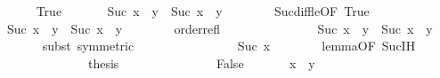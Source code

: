 \begin{isabellebody}
\ \ \ \ \isamarkupfalse%
\ True\isanewline
\ \ \ \ \isamarkupfalse%
\ {}{\isacharcolon}{\kern0pt}\ {\isachardoublequoteopen}{\isacharparenleft}{\kern0pt}Suc\ x{\isacharparenright}{\kern0pt}\ {\isacharminus}{\kern0pt}\ y\ {\isacharequal}{\kern0pt}\ Suc\ {\isacharparenleft}{\kern0pt}x\ {\isacharminus}{\kern0pt}\ y{\isacharparenright}{\kern0pt}{\isachardoublequoteclose}\isanewline
\ \ \ \ \ \ \isamarkupfalse%
\ Suc{\isacharunderscore}{\kern0pt}diff{\isacharunderscore}{\kern0pt}le{\isacharbrackleft}{\kern0pt}OF\ True{\isacharbrackright}{\kern0pt}\isanewline
\ \ \ \ \ \ \isacommand{{\isachardot}{\kern0pt}}\isamarkupfalse%
\isanewline
\ \ \ \ \isamarkupfalse%
\ {\isachardoublequoteopen}Suc\ x\ {\isacharminus}{\kern0pt}\ y\ {\isasymle}\ Suc\ x\ {\isacharminus}{\kern0pt}\ y{\isachardoublequoteclose}\isanewline
\ \ \ \ \ \ \isamarkupfalse%
\ order{\isachardot}{\kern0pt}refl\isanewline
\ \ \ \ \ \ \isacommand{{\isachardot}{\kern0pt}}\isamarkupfalse%
\isanewline
\ \ \ \ \isamarkupfalse%
\ \isamarkupfalse%
\ {}{\isacharcolon}{\kern0pt}\ {\isachardoublequoteopen}Suc\ x\ {\isacharminus}{\kern0pt}\ y\ {\isasymle}\ Suc\ {\isacharparenleft}{\kern0pt}x\ {\isacharminus}{\kern0pt}\ y{\isacharparenright}{\kern0pt}{\isachardoublequoteclose}\isanewline
\ \ \ \ \ \ \isamarkupfalse%
{\isacharparenleft}{\kern0pt}subst\ {}{\isacharbrackleft}{\kern0pt}symmetric{\isacharbrackright}{\kern0pt}{\isacharparenright}{\kern0pt}\isanewline
\ \ \ \ \ \ \isacommand{{\isachardot}{\kern0pt}}\isamarkupfalse%
\isanewline
\ \ \ \ \isamarkupfalse%
\ \isamarkupfalse%
\ {\isachardoublequoteopen}{\isachardot}{\kern0pt}{\isachardot}{\kern0pt}{\isachardot}{\kern0pt}\ {\isasymle}\ Suc\ x{\isachardoublequoteclose}\isanewline
\ \ \ \ \ \ \isamarkupfalse%
\ lemma{}{\isacharbrackleft}{\kern0pt}OF\ Suc{\isachardot}{\kern0pt}IH{\isacharbrackright}{\kern0pt}\isanewline
\ \ \ \ \ \ \isacommand{{\isachardot}{\kern0pt}}\isamarkupfalse%
\isanewline
\ \ \ \ \isamarkupfalse%
\ \isamarkupfalse%
\ {\isacharquery}{\kern0pt}thesis\isanewline
\ \ \ \ \ \ \isacommand{{\isachardot}{\kern0pt}}\isamarkupfalse%
\isanewline
\ \ \isamarkupfalse%
\isanewline
\ \ \ \ \isamarkupfalse%
\ False\isanewline
\ \ \ \ \isamarkupfalse%
\ {}{\isacharcolon}{\kern0pt}\ {\isachardoublequoteopen}x\ {\isacharless}{\kern0pt}\ y{\isachardoublequoteclose}\isanewline

\end{isabellebody}
